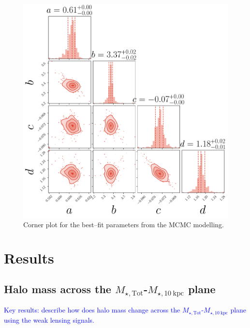 \documentclass[a4paper,fleqn,usenatbib]{mnras}
\def\mtot{{$M_{\star,\mathrm{Tot}}$}}
\def\minn{{$M_{\star,10\ \mathrm{kpc}}$}}
\newcommand{\plan}[1]{\textcolor{blue}{#1}}
\begin{document}
    \begin{figure}
        \centering 
        \includegraphics[width=\columnwidth]{fig/um2_model_A_corner}
            \caption{
                Corner plot for the best--fit parameters from the MCMC modelling.
                }
        \label{fig:um2_m100_m10_2}
    \end{figure}

\section{Results}
    \label{sec:result}

\subsection{Halo mass across the \mtot{}-\minn{} plane}
    \label{ssec:mhalo_wl}
    
    \plan{Key results: describe how does halo mass change across the \mtot{}-\minn{} 
          plane using the weak lensing signals.}
\end{document}
